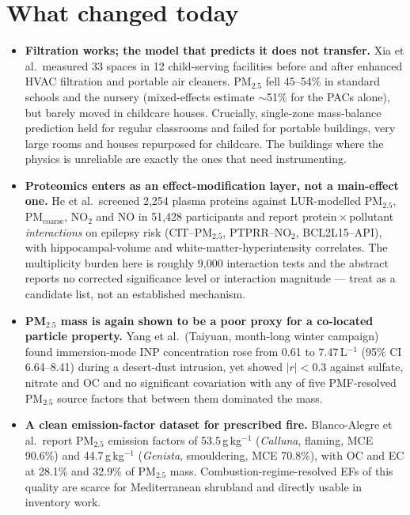 \documentclass[10pt]{article}
\begin{document}
\section*{\sffamily\bfseries\color{Deep}What changed today}
\vspace{-1.5mm}{\color{Amber}\rule{\linewidth}{1.1pt}}\vspace{2.5mm}

\footnotesize
\begin{itemize}
\item \textbf{Filtration works; the model that predicts it does not transfer.} Xia et al.\
measured 33 spaces in 12 child-serving facilities before and after enhanced HVAC filtration
and portable air cleaners. PM$_{2.5}$ fell 45--54\% in standard schools and the nursery
(mixed-effects estimate $\sim$51\% for the PACs alone), but barely moved in childcare
houses. Crucially, single-zone mass-balance prediction held for regular classrooms and
failed for portable buildings, very large rooms and houses repurposed for childcare. The
buildings where the physics is unreliable are exactly the ones that need instrumenting.

\item \textbf{Proteomics enters as an effect-modification layer, not a main-effect one.}
He et al.\ screened 2{,}254 plasma proteins against LUR-modelled PM$_{2.5}$, PM$_{\mathrm{coarse}}$,
NO$_2$ and NO in 51{,}428 participants and report protein\,$\times$\,pollutant
\emph{interactions} on epilepsy risk (CIT--PM$_{2.5}$, PTPRR--NO$_2$, BCL2L15--API), with
hippocampal-volume and white-matter-hyperintensity correlates. The multiplicity burden here
is roughly 9{,}000 interaction tests and the abstract reports no corrected significance
level or interaction magnitude --- treat as a candidate list, not an established mechanism.

\item \textbf{PM$_{2.5}$ mass is again shown to be a poor proxy for a co-located particle
property.} Yang et al.\ (Taiyuan, month-long winter campaign) found immersion-mode INP
concentration rose from 0.61 to 7.47\,L$^{-1}$ (95\% CI 6.64--8.41) during a desert-dust
intrusion, yet showed $|r|<0.3$ against sulfate, nitrate and OC and no significant covariation
with any of five PMF-resolved PM$_{2.5}$ source factors that between them dominated the mass.

\item \textbf{A clean emission-factor dataset for prescribed fire.} Blanco-Alegre et al.\
report PM$_{2.5}$ emission factors of 53.5\,g\,kg$^{-1}$ (\textit{Calluna}, flaming,
MCE 90.6\%) and 44.7\,g\,kg$^{-1}$ (\textit{Genista}, smouldering, MCE 70.8\%), with OC and
EC at 28.1\% and 32.9\% of PM$_{2.5}$ mass. Combustion-regime-resolved EFs of this quality
are scarce for Mediterranean shrubland and directly usable in inventory work.


\end{itemize}
\end{document}
